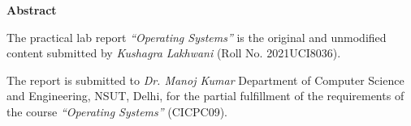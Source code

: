 \center\textbf{\large Abstract}

\begin{justify}
	The practical lab report \textit{``Operating Systems''} is the original and unmodified content submitted by \textit{Kushagra Lakhwani} (Roll No. 2021UCI8036).

	The report is submitted to \textit{Dr. Manoj Kumar} Department of Computer Science and Engineering, NSUT, Delhi, for the partial fulfillment of the requirements of the course \textit{``Operating Systems''} (CICPC09).
\end{justify}

\pagebreak
